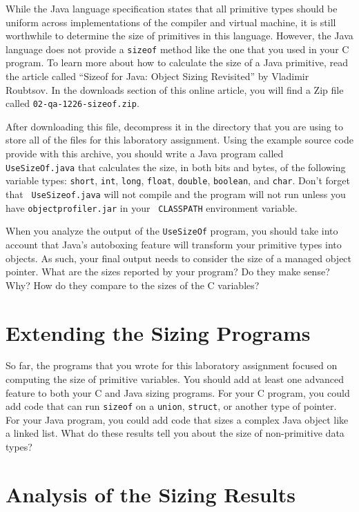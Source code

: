   While the Java language specification states that all primitive types should be uniform across implementations of the
  compiler and virtual machine, it is still worthwhile to determine the size of primitives in this language. However,
  the Java language does not provide a {\tt sizeof} method like the one that you used in your C program. To learn more
  about how to calculate the size of a Java primitive, read the article called ``Sizeof for Java: Object Sizing
  Revisited'' by Vladimir Roubtsov. In the downloads section of this online article, you will find a Zip file called
  {\tt 02-qa-1226-sizeof.zip}. 

  After downloading this file, decompress it in the directory that you are using to store all of the files for this
  laboratory assignment. Using the example source code provide with this archive, you should write a Java program called
  {\tt UseSizeOf.java} that calculates the size, in both bits and bytes, of the following variable types:  {\tt short},
  {\tt int}, {\tt long}, {\tt float}, {\tt double}, {\tt boolean}, and {\tt char}. Don't forget that {\tt
  UseSizeof.java} will not compile and the program will not run unless you have {\tt objectprofiler.jar} in your {\tt
  CLASSPATH} environment variable. 
  
  When you analyze the output of the {\tt UseSizeOf} program, you should take into account that Java's autoboxing
  feature will transform your primitive types into objects.  As such, your final output needs to consider the size of a
  managed object pointer. What are the sizes reported by your program? Do they make sense? Why? How do they compare to
  the sizes of the C variables?

\section*{Extending the Sizing Programs}

  So far, the programs that you wrote for this laboratory assignment focused on computing the size of primitive
  variables.  You should add at least one advanced feature to both your C and Java sizing programs.  For your C program,
  you could add code that can run {\tt sizeof} on a {\tt union}, {\tt struct}, or another type of pointer. For your Java
  program, you could add code that sizes a complex Java object like a linked list. What do these results tell you about
  the size of non-primitive data types?

\section*{Analysis of the Sizing Results}

